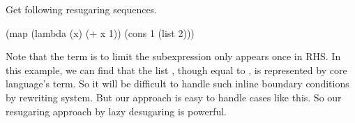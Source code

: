 Get following resugaring sequences.
\begin{Codes}
    (map (lambda (x) (+ x 1)) (cons 1 (list 2)))
\end{Codes}

Note that the  term is to limit the subexpression only appears once in RHS. In this example, we can find that the list , though equal to , is represented by core language's term. So it will be difficult to handle such inline boundary conditions by rewriting system. But our approach is easy to handle cases like this. So our resugaring approach by lazy desugaring is powerful.
